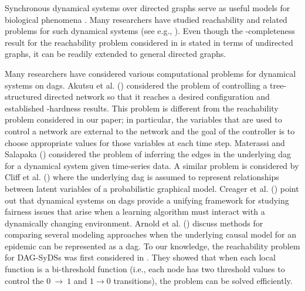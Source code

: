 Synchronous dynamical systems over 
directed graphs serve as useful models for biological
phenomena \cite{Kauffman-etal-2003}.
Many researchers have studied reachability and related 
problems for such dynamical systems (see e.g., 
\cite{OU-2020,OU-2017}). 
Even though the \cpsp-completeness result for the reachability problem 
considered in \cite{Rosenkrantz-etal-2018} is stated in terms of undirected
graphs, it can be readily extended to general directed graphs.

Many researchers have considered various computational
problems for dynamical systems on dags.
Akutsu et al. (\citeyear{Akutsu-etal-2007}) considered the problem
of controlling a tree-structured directed network so that it
reaches a desired configuration and established \cnp-hardness
results. This problem 
is different from the reachability problem
considered in our paper; in particular, the variables that are used to
control a network are external to the network and the goal of the controller
is to choose appropriate values for those variables at each time step.
Materassi and Salapaka (\citeyear{Materassi-etal-2013}) considered the
problem of inferring the edges in the underlying dag for a dynamical
system given time-series data.
A similar problem is considered by 
Cliff et al. (\citeyear{Cliff-etal-2016}) where the underlying
dag is assumed to represent relationships between latent 
variables of a probabilistic graphical model.
Creager et al. (\citeyear{Creager-etal-2020}) point out that dynamical systems
on dags provide a unifying framework for studying fairness issues that
arise when a learning algorithm must interact with a dynamically
changing environment.
Arnold et al. (\citeyear{Arnold-etal-2019}) discuss methods
for comparing several modeling approaches when the underlying causal model
for an epidemic can be represented as a dag.
To our knowledge, the reachability problem for DAG-SyDSs 
was first considered in \cite{KKM+2013}. 
They showed that when each local function is 
a bi-threshold function (i.e., each node has two threshold
values to control the $0 ~\rightarrow~  1$ and $1 \rightarrow 0$
transitions), the problem can be solved efficiently.

